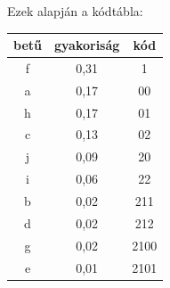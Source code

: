 \documentclass[margin=0px]{article}
\begin{document}
\begin{description}
        Ezek alapján a kódtábla:

        \begin{tabular}{|c|c|c|}
            \hline betű & gyakoriság & kód  \\
            \hline f    & 0,31       & 1    \\
            \hline a    & 0,17       & 00   \\
            \hline h    & 0,17       & 01   \\
            \hline c    & 0,13       & 02   \\
            \hline j    & 0,09       & 20   \\
            \hline i    & 0,06       & 22   \\
            \hline b    & 0,02       & 211  \\
            \hline d    & 0,02       & 212  \\
            \hline g    & 0,02       & 2100 \\
            \hline e    & 0,01       & 2101 \\
            \hline
        \end{tabular}
\end{description}
\end{document}
